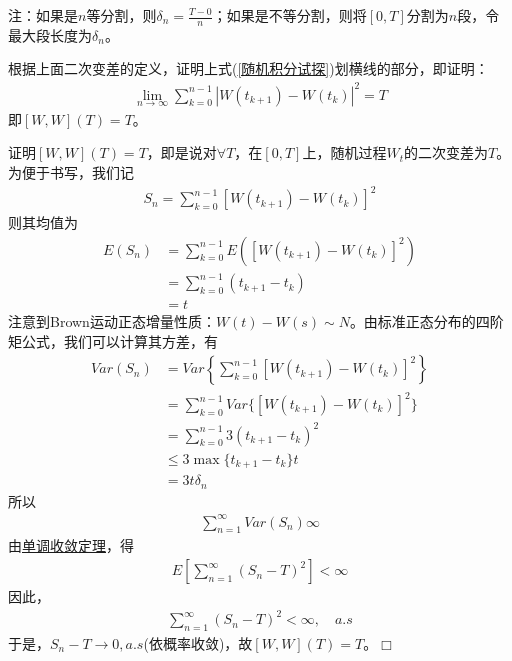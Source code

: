         注：如果是$n$等分割，则$\delta_n = \frac{T-0}{n}$；如果是不等分割，则将$[0,T]$分割为$n$段，令最大段长度为$\delta _n$。
        \par
        根据上面二次变差的定义，证明上式(\ref{随机积分试探})划横线的部分，即证明：
        \begin{align}
            \label{Brown运动的二次变差}
            \lim_{n\rightarrow \infty} \sum_{k = 0}^{n - 1} |W(t_{k+1}) - W(t_k)|^2 = T
        \end{align}
        即$[W,W](T) = T$。
        \renewcommand\qedsymbol{\ensuremath {\Box}}
        \begin{Proof}
            证明$[W,W](T) = T$，即是说对$\forall T$，在$[0,T]$上，随机过程$W_t$的二次变差为$T$。为便于书写，我们记
            \begin{align*}
                S_n = \sum_{k = 0}^{n-1}[W(t_{k+1}) - W(t_k)]^2
            \end{align*}
            则其均值为
            \begin{align*}
                E(S_n) &= \sum_{k = 0}^{n - 1} E([W(t_{k+1}) - W(t_k)]^2)\\
                & = \sum_{k = 0}^{n - 1}(t_{k+1} - t_k)\\
                & = t
            \end{align*}
            注意到Brown运动正态增量性质：$W(t) - W(s) \sim N$。由标准正态分布的四阶矩公式，我们可以计算其方差，有
            \begin{align*}
                Var(S_n) &= Var \left\{ \sum_{k = 0}^{n-1}[W(t_{k+1}) - W(t_k)]^2 \right\}\\
                &= \sum_{k = 0}^{n-1} Var \{ [W(t_{k+1}) - W(t_k)]^2  \}\\
                &= \sum_{k = 0}^{n-1} 3 (t_{k+1} - t_k)^2 \\
                &\leqslant 3\max\{ t_{k+1} - t_k \} t\\
                &= 3t \delta_n
            \end{align*}
            所以
            \begin{align*}
                \sum_{n = 1}^\infty Var(S_n) \infty
            \end{align*}
            由\underline{单调收敛定理}，得
            \begin{align*}
                E\left[\sum_{n = 1}^\infty (S_n - T)^2\right] <\infty
            \end{align*}
            因此，
            \begin{align*}
                \sum_{n = 1}^\infty (S_n - T)^2 < \infty ,\quad a.s
            \end{align*}
            于是，$S_n - T \rightarrow 0, a.s$(依概率收敛)，故$[W,W](T) = T$。$\qedsymbol$
        \end{Proof}
